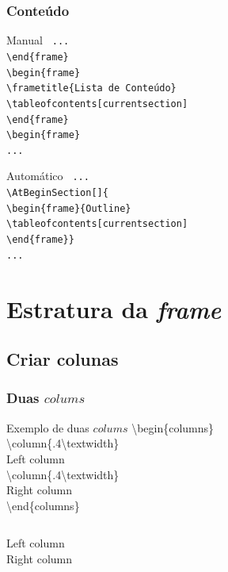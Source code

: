 \documentclass[article]{beamer}%
\begin{document}
\begin{frame}
\frametitle{Conteúdo} 

\begin{block}{Manual}
\scriptsize{\tt{
...\\
\textbackslash end\{frame\}\\
\vspace{0.1cm}
\textbackslash begin\{frame\}\\
\textbackslash frametitle\{Lista de Conteúdo\}\\
\textbackslash tableofcontents[currentsection]\\
\textbackslash end\{frame\}\\
\vspace{0.2cm}
\textbackslash begin\{frame\}\\
...\\
}}
\end{block}

\begin{block}{Automático}
\scriptsize{\tt{
...\\
\textbackslash AtBeginSection[]\{\\
\textbackslash begin\{frame\}\{Outline\}\\
\textbackslash tableofcontents[currentsection]\\
\textbackslash end\{frame\}\}\\
...\\
}}
\end{block}
\end{frame}

\section{Estratura da \emph{frame}}
\subsection{Criar colunas}


\begin{frame}
\frametitle{Duas $colums$}
\begin{block}{Exemplo de duas $colums$}\scriptsize{
\textbackslash begin\{columns\}\\
\textbackslash column\{.4\textbackslash textwidth\}\\
Left column\\
\textbackslash column\{.4\textbackslash textwidth\}\\
Right column\\
\textbackslash end\{columns\}\\
}
\end{block}
\vspace{1cm}
\begin{columns}
Left column\\
Right column\\
\end{columns}
\end{frame}
\end{document}
